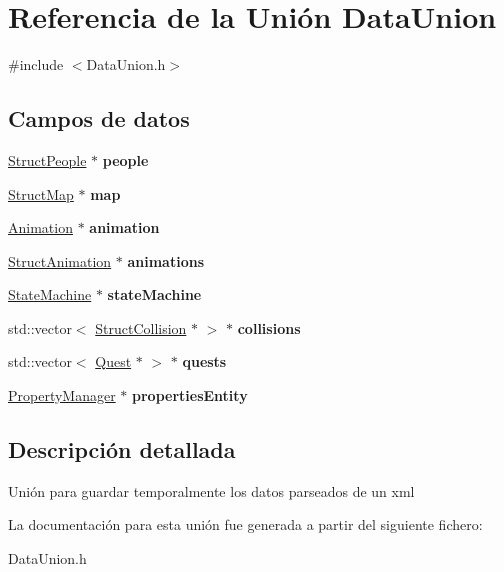 \hypertarget{unionDataUnion}{}\section{Referencia de la Unión Data\+Union}
\label{unionDataUnion}


{\ttfamily \#include $<$Data\+Union.\+h$>$}

\subsection*{Campos de datos}
\begin{DoxyCompactItemize}
\item 
\hypertarget{unionDataUnion_a5705561f2e10c3bcc7596a451f67659b}{}\hyperlink{structStructPeople}{Struct\+People} $\ast$ {\bfseries people}\label{unionDataUnion_a5705561f2e10c3bcc7596a451f67659b}

\item 
\hypertarget{unionDataUnion_a1f06a482f7be35f5d6f7649649040e6c}{}\hyperlink{structStructMap}{Struct\+Map} $\ast$ {\bfseries map}\label{unionDataUnion_a1f06a482f7be35f5d6f7649649040e6c}

\item 
\hypertarget{unionDataUnion_a1a0bde2aa52acd09796f24853ae068a6}{}\hyperlink{classAnimation}{Animation} $\ast$ {\bfseries animation}\label{unionDataUnion_a1a0bde2aa52acd09796f24853ae068a6}

\item 
\hypertarget{unionDataUnion_a732b43c4b3d1915caf82680a51f5e7e5}{}\hyperlink{structStructAnimation}{Struct\+Animation} $\ast$ {\bfseries animations}\label{unionDataUnion_a732b43c4b3d1915caf82680a51f5e7e5}

\item 
\hypertarget{unionDataUnion_aeb971f7891fc8b2ecee5d745b0b89dc0}{}\hyperlink{classStateMachine}{State\+Machine} $\ast$ {\bfseries state\+Machine}\label{unionDataUnion_aeb971f7891fc8b2ecee5d745b0b89dc0}

\item 
\hypertarget{unionDataUnion_a50eaac3c29d6c6df2b81f5665a8a7afd}{}std\+::vector$<$ \hyperlink{structStructCollision}{Struct\+Collision} $\ast$ $>$ $\ast$ {\bfseries collisions}\label{unionDataUnion_a50eaac3c29d6c6df2b81f5665a8a7afd}

\item 
\hypertarget{unionDataUnion_a9ff0ceb279b1d158acc3f87c59f42f93}{}std\+::vector$<$ \hyperlink{classQuest}{Quest} $\ast$ $>$ $\ast$ {\bfseries quests}\label{unionDataUnion_a9ff0ceb279b1d158acc3f87c59f42f93}

\item 
\hypertarget{unionDataUnion_aa6918a8c6ec097e435dd7a415e392cdb}{}\hyperlink{classPropertyManager}{Property\+Manager} $\ast$ {\bfseries properties\+Entity}\label{unionDataUnion_aa6918a8c6ec097e435dd7a415e392cdb}

\end{DoxyCompactItemize}


\subsection{Descripción detallada}
Unión para guardar temporalmente los datos parseados de un xml 

La documentación para esta unión fue generada a partir del siguiente fichero\+:\begin{DoxyCompactItemize}
\item 
Data\+Union.\+h\end{DoxyCompactItemize}
